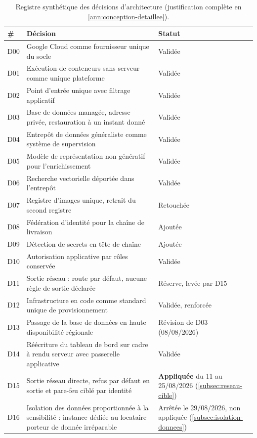 \begin{table}[htbp]
\caption[Registre synthétique des décisions d'architecture]{Registre synthétique des décisions d'architecture (justification complète en \cref{ann:conception-detaillee}).}
\label{tab:registre-decisions}
\centering
\footnotesize
\setlength{\tabcolsep}{3.5pt}
\renewcommand{\arraystretch}{1.05}
\begin{tabular}{|P{1.0cm}|P{10.5cm}|P{3.6cm}|}
\hline
\# & Décision & Statut \\
\hline
D00 & Google Cloud comme fournisseur unique du socle & Validée \\ \hline
D01 & Exécution de conteneurs sans serveur comme unique plateforme & Validée \\ \hline
D02 & Point d'entrée unique avec filtrage applicatif & Validée \\ \hline
D03 & Base de données managée, adresse privée, restauration à un instant donné & Validée \\ \hline
D04 & Entrepôt de données généraliste comme système de supervision & Validée \\ \hline
D05 & Modèle de représentation non génératif pour l'enrichissement & Validée \\ \hline
D06 & Recherche vectorielle déportée dans l'entrepôt & Validée \\ \hline
D07 & Registre d'images unique, retrait du second registre & Retouchée \\ \hline
D08 & Fédération d'identité pour la chaîne de livraison & Ajoutée \\ \hline
D09 & Détection de secrets en tête de chaîne & Ajoutée \\ \hline
D10 & Autorisation applicative par rôles conservée & Validée \\ \hline
D11 & Sortie réseau : route par défaut, aucune règle de sortie déclarée & Réserve, levée par D15 \\ \hline
D12 & Infrastructure en code comme standard unique de provisionnement & Validée, renforcée \\ \hline
D13 & Passage de la base de données en haute disponibilité régionale & Révision de D03
(08/08/2026) \\ \hline
D14 & Réécriture du tableau de bord sur cadre à rendu serveur avec passerelle applicative &
Validée \\ \hline
D15 & Sortie réseau directe, refus par défaut en sortie et pare-feu ciblé par identité &
\textbf{Appliquée} du 11 au 25/08/2026 (\cref{subsec:reseau-cible}) \\ \hline
D16 & Isolation des données proportionnée à la sensibilité : instance dédiée au locataire
porteur de donnée irréparable & Arrêtée le 29/08/2026, non appliquée (\cref{subsec:isolation-donnees}) \\
\hline
\end{tabular}
\end{table}

